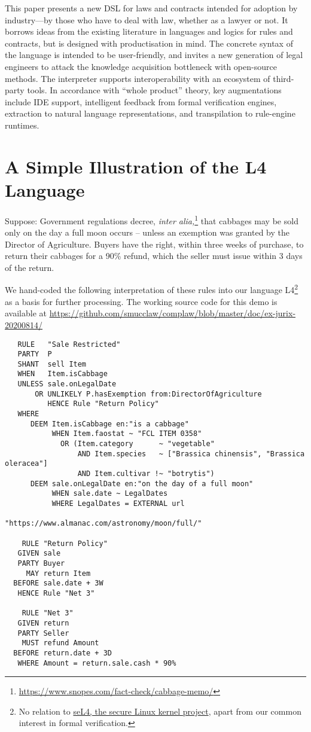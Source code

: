 \documentclass{IOS-Book-Article}
\begin{document}
This paper presents a new DSL for laws and contracts intended for adoption by industry---by those who have to deal with law, whether as a lawyer or not. It borrows ideas from the existing literature in languages and logics for rules and contracts, but is designed with productisation in mind. The concrete syntax of the language is intended to be user-friendly, and invites a new generation of legal engineers to attack the knowledge acquisition bottleneck with open-source methods. The interpreter supports interoperability with an ecosystem of third-party tools. In accordance with ``whole product'' theory, key augmentations include IDE support, intelligent feedback from formal verification engines, extraction to natural language representations, and transpilation to rule-engine runtimes.

\section{A Simple Illustration of the L4 Language}

Suppose: Government regulations decree, \textit{inter alia,}\footnote{\url{https://www.snopes.com/fact-check/cabbage-memo/}} that cabbages may be sold only on the day a full moon occurs -- unless an exemption was granted by the Director of Agriculture. Buyers have the right, within three weeks of purchase, to return their cabbages for a 90\% refund, which the seller must issue within 3 days of the return.

We hand-coded the following interpretation of these rules into our language L4\footnote{No relation to \href{https://dl.acm.org/doi/10.1145/1629575.1629596}{seL4, the secure Linux kernel project}, apart from our common interest in formal verification.} as a basis for further processing. The working source code for this demo is available at \url{https://github.com/smucclaw/complaw/blob/master/doc/ex-jurix-20200814/}

\begin{lstlisting}
   RULE   "Sale Restricted"
   PARTY  P
   SHANT  sell Item
   WHEN   Item.isCabbage
   UNLESS sale.onLegalDate
       OR UNLIKELY P.hasExemption from:DirectorOfAgriculture
          HENCE Rule "Return Policy"
   WHERE
      DEEM Item.isCabbage en:"is a cabbage"
           WHEN Item.faostat ~ "FCL ITEM 0358"
             OR (Item.category      ~ "vegetable"
                 AND Item.species   ~ ["Brassica chinensis", "Brassica oleracea"]
                 AND Item.cultivar !~ "botrytis")
      DEEM sale.onLegalDate en:"on the day of a full moon"
           WHEN sale.date ~ LegalDates
           WHERE LegalDates = EXTERNAL url
                              "https://www.almanac.com/astronomy/moon/full/"
        
    RULE "Return Policy"
   GIVEN sale
   PARTY Buyer
     MAY return Item
  BEFORE sale.date + 3W
   HENCE Rule "Net 3"
   
    RULE "Net 3"
   GIVEN return
   PARTY Seller
    MUST refund Amount
  BEFORE return.date + 3D
   WHERE Amount = return.sale.cash * 90%
\end{lstlisting}
\end{document}
